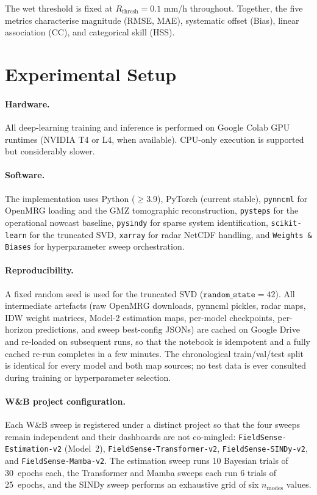 \documentclass[12pt, a4paper]{article}
\begin{document}
The wet threshold is fixed at \(R_{\text{thresh}} = 0.1\) mm/h
throughout. Together, the five metrics characterise magnitude
(RMSE, MAE), systematic offset (Bias), linear association (CC), and
categorical skill (HSS).

\section{Experimental Setup}\label{sec:setup}

\paragraph{Hardware.} All deep-learning training and inference is
performed on Google Colab GPU runtimes (NVIDIA T4 or L4, when
available). CPU-only execution is supported but considerably slower.

\paragraph{Software.} The implementation uses Python (\(\ge\)3.9),
PyTorch (current stable), \texttt{pynncml} for OpenMRG loading and
the GMZ tomographic reconstruction, \texttt{pysteps} for the
operational nowcast baseline, \texttt{pysindy} for sparse system
identification, \texttt{scikit-learn} for the truncated SVD,
\texttt{xarray} for radar NetCDF handling, and \texttt{Weights \&
Biases} for hyperparameter sweep orchestration.

\paragraph{Reproducibility.} A fixed random seed is used for the
truncated SVD (\(\texttt{random\_state}=42\)). All intermediate
artefacts (raw OpenMRG downloads, pynncml pickles, radar maps, IDW
weight matrices, Model-2 estimation maps, per-model checkpoints, per-
horizon predictions, and sweep best-config JSONs) are cached on Google
Drive and re-loaded on subsequent runs, so that the notebook is
idempotent and a fully cached re-run completes in a few minutes. The
chronological train/val/test split is identical for every model and
both map sources; no test data is ever consulted during training or
hyperparameter selection.

\paragraph{W\&B project configuration.} Each W\&B sweep is registered
under a distinct project so that the four sweeps remain independent and
their dashboards are not co-mingled:
\texttt{FieldSense-Estimation-v2} (Model~2),
\texttt{FieldSense-Transformer-v2},
\texttt{FieldSense-SINDy-v2}, and
\texttt{FieldSense-Mamba-v2}. The estimation sweep runs 10 Bayesian
trials of 30~epochs each, the Transformer and Mamba sweeps each run 6
trials of 25~epochs, and the SINDy sweep performs an exhaustive grid
of six \(n_{\text{modes}}\) values.
\end{document}
